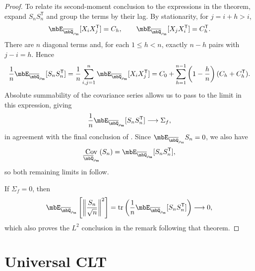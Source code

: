\documentclass[a4paper]{article}
\numberwithin{equation}{section}   %
\theoremstyle{plain}   %
\theoremstyle{plain}   %
\theoremstyle{examplestyle}
\newcommand{\s}{\rho_{\mathsf{ss}}}     %
\DeclareMathOperator{\str}{tr} %
\DeclareMathOperator{\Cov}{Cov}
\begin{document}
\begin{proof}
        To relate its second-moment conclusion to the expressions in the
        theorem, expand $S_nS_n^{\mathsf T}$ and group the terms by their lag.
        By stationarity, for $j=i+h>i$,
        \[
            \mbE_{\overline\mbQ_{\s}}[X_iX_j^{\mathsf T}]=C_h,
            \qquad
            \mbE_{\overline\mbQ_{\s}}[X_jX_i^{\mathsf T}]
            =C_h^{\mathsf T}.
        \]
        There are $n$ diagonal terms and, for each $1\le h<n$,
        exactly $n-h$ pairs with $j-i=h$. Hence
        \[
            \begin{aligned}
                \frac1n\mbE_{\overline\mbQ_{\s}}[S_nS_n^{\mathsf T}]
                =
                \frac1n\sum_{i,j=1}^n
                    \mbE_{\overline\mbQ_{\s}}[X_iX_j^{\mathsf T}]
                =
                C_0+\sum_{h=1}^{n-1}
                     \left(1-\frac hn\right)(C_h+C_h^{\mathsf T}).
            \end{aligned}
        \]
        Absolute summability of the covariance series allows us to pass to the limit in this expression, giving
        \begin{equation}
        \label{eq:universal-stationary-moments}
            \frac1n\mbE_{\overline\mbQ_{\s}}[S_nS_n^{\mathsf T}]
            \longrightarrow\Sigma_f,
        \end{equation}
        in agreement with the final conclusion of .
        Since $\mbE_{\overline\mbQ_{\s}}S_n=0$, we also have
        \[
            \Cov_{\overline\mbQ_{\s}}(S_n)
            =
            \mbE_{\overline\mbQ_{\s}}[S_nS_n^{\mathsf T}],
        \]
        so both remaining limits in  follow.
        
        If $\Sigma_f=0$, then
        \[
            \mbE_{\overline\mbQ_{\s}}
                \left[\left\|\frac{S_n}{\sqrt n}\right\|^2\right]
            =
            \str\left(
                \frac1n\mbE_{\overline\mbQ_{\s}}
                    [S_nS_n^{\mathsf T}]
            \right)
            \longrightarrow0,
        \]
        which also proves the $L^2$ conclusion in the remark following that theorem.
    \end{proof}


\section{Universal CLT}
\end{document}
